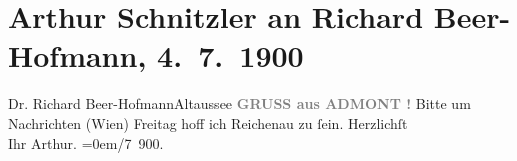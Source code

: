 

         
         \renewcommand{\erwaehntePersonen}{Personen: Richard Beer-Hofmann}
         \renewcommand{\erwaehnteOrte}{Orte: Admont, Altaussee, Reichenau an der Rax, Wien}
         \renewcommand{\erwaehnteWerke}{}
               \section[Arthur Schnitzler an Richard Beer-Hofmann, 4. 7. 1900]{ Arthur Schnitzler an Richard Beer-Hofmann, 4. 7. 1900}\nopagebreak{}\rehead{ }\begin{ledgroupsized}[t]{13cm}\normalsize\beginnumbering \toendnotes[C]{\smallbreak\pagebreak[2]} 
\pstart{}{\pb}Dr. Richard Beer-Hofmann\pend{}\pstart{}Altaussee\pend{}{\bigskip}\pstart
           \noindent{}\centering{}{\pb}\textcolor{gray}{\textbf{GRUSS aus ADMONT !}}\pend
           \pstart
           Bitte um Nachrichten (Wien)\pend
           \pstart
           Freitag hoff ich Reichenau zu
               ſein.\pend
           \pstart
           Herzlichſt{\\[\baselineskip]}Ihr \spacefill\mbox{Arthur.}\pend
           \leftskip=0em{}/7 900.\pend
           
         
         \endnumbering{}\end{ledgroupsized}  \newcommand{\dateiname}{L01051}\newcommand{\titel}{Arthur Schnitzler an Richard Beer-Hofmann, 4. 7. 1900}\newcommand{\editorInnen}{Martin Anton Müller und Gerd-Hermann Susen}
      